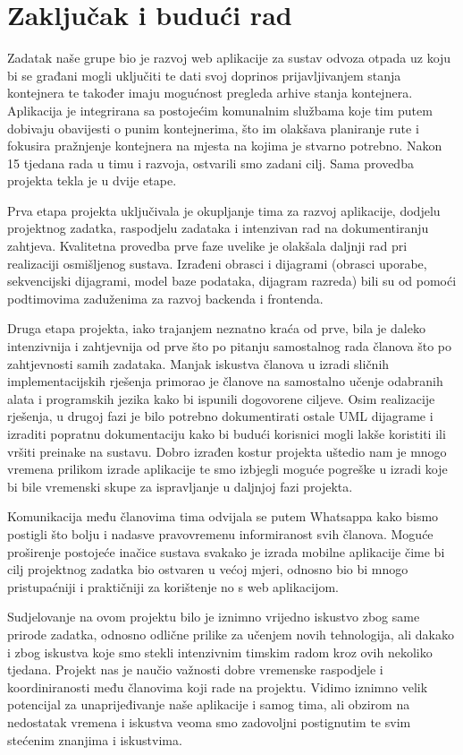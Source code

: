 \chapter{Zaključak i budući rad}
	
	Zadatak naše grupe bio je razvoj web aplikacije za sustav odvoza otpada uz koju bi se građani mogli uključiti te dati svoj doprinos prijavljivanjem stanja kontejnera te također imaju mogućnost pregleda arhive stanja kontejnera. Aplikacija je integrirana sa postojećim komunalnim službama koje tim putem dobivaju obavijesti o punim kontejnerima, što im olakšava planiranje rute i fokusira pražnjenje kontejnera na mjesta na kojima je stvarno potrebno. Nakon 15 tjedana rada u timu i razvoja, ostvarili smo zadani cilj. Sama provedba projekta tekla je u dvije etape.
	
		Prva etapa projekta uključivala je okupljanje tima za razvoj aplikacije, dodjelu projektnog zadatka, raspodjelu zadataka i intenzivan rad na dokumentiranju zahtjeva. Kvalitetna provedba prve faze uvelike je olakšala daljnji rad pri realizaciji osmišljenog sustava. Izrađeni obrasci i dijagrami (obrasci uporabe, sekvencijski dijagrami, model baze podataka, dijagram razreda) bili su od pomoći podtimovima zaduženima za razvoj backenda i frontenda. 
		
		Druga etapa projekta, iako trajanjem neznatno kraća od prve, bila je daleko intenzivnija i zahtjevnija od prve što po pitanju samostalnog rada članova što po zahtjevnosti samih zadataka. Manjak iskustva članova u izradi sličnih implementacijskih rješenja primorao je članove na samostalno učenje odabranih alata i programskih jezika kako bi ispunili dogovorene ciljeve. Osim realizacije rješenja, u drugoj fazi je bilo potrebno dokumentirati ostale UML dijagrame i izraditi popratnu dokumentaciju kako bi budući korisnici mogli lakše koristiti ili vršiti preinake na sustavu. Dobro izrađen kostur projekta uštedio nam je mnogo vremena prilikom izrade aplikacije te smo izbjegli moguće pogreške u izradi koje bi bile vremenski skupe za ispravljanje u daljnjoj fazi projekta.
		
		Komunikacija među članovima tima odvijala se putem Whatsappa kako bismo postigli što bolju i nadasve pravovremenu informiranost svih članova. Moguće proširenje postojeće inačice sustava svakako je izrada mobilne aplikacije čime bi cilj projektnog zadatka bio ostvaren u većoj mjeri, odnosno bio bi mnogo pristupaćniji i praktičniji za korištenje no s web aplikacijom. 
		
		Sudjelovanje na ovom projektu bilo je iznimno vrijedno iskustvo zbog same prirode zadatka, odnosno odlične prilike za učenjem novih tehnologija, ali dakako i zbog iskustva koje smo stekli intenzivnim timskim radom kroz ovih nekoliko tjedana. Projekt nas je naučio važnosti dobre vremenske raspodjele i koordiniranosti među članovima koji rade na projektu. Vidimo iznimno velik potencijal za unaprijeđivanje naše aplikacije i samog tima, ali obzirom na nedostatak vremena i iskustva veoma smo zadovoljni postignutim te svim stećenim znanjima i iskustvima.
		
		\eject 